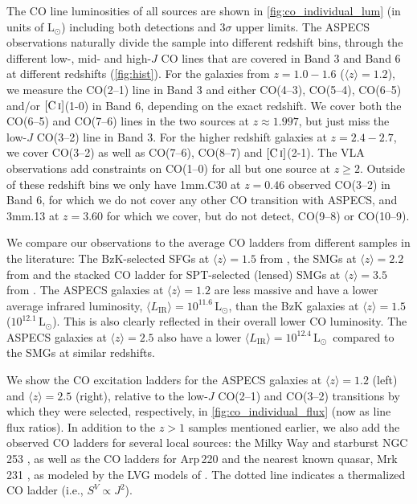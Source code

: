 \documentclass[twocolumn]{aastex62}
\newcommand{\solarlum}{\ensuremath{\mathrm{L}_{\odot}}}
\newcommand{\Lsun}{\solarlum}
\newcommand{\LIR}{\ensuremath{L_{\mathrm{IR}}}}
\newcommand{\avg}[1]{\ensuremath{\langle #1 \rangle}}
\newcommand{\CI}{\ensuremath{\mathrm{[C\, \textsc{i}]}}}
\begin{document}
The CO line luminosities of all sources are shown in
\autoref{fig:co_individual_lum} (in units of \Lsun) including both detections
and $3\sigma$ upper limits.  The ASPECS observations naturally divide the
sample into different redshift bins, through the different low-, mid- and
high-$J$ CO lines that are covered in Band 3 and Band 6 at different redshifts
(\autoref{fig:hist}).  For the galaxies from $z=1.0 - 1.6$ ($\avg{z}=1.2$), we
measure the CO(2--1) line in Band 3 and either CO(4--3), CO(5--4), CO(6--5)
and/or \CI(1-0) in Band 6, depending on the exact redshift.  We cover both the
CO(6--5) and CO(7--6) lines in the two sources at $z\approx 1.997$, but just
miss the low-$J$ CO(3--2) line in Band 3.  For the higher redshift galaxies at
$z=2.4-2.7$, we cover CO(3--2) as well as CO(7--6), CO(8--7) and \CI(2-1).  The
VLA observations add constraints on CO(1--0) for all but one source at $z\ge2$.
Outside of these redshift bins we only have 1mm.C30 at $z=0.46$ observed
CO(3--2) in Band 6, for which we do not cover any other CO transition with
ASPECS, and 3mm.13 at $z=3.60$ for which we cover, but do not detect, CO(9--8)
or CO(10--9).

We compare our observations to the average CO ladders from different samples in
the literature: The BzK-selected SFGs at $\avg{z}=1.5$ from \cite{Daddi2015},
the SMGs at $\avg{z}=2.2$ from \cite{Bothwell2013} and the stacked CO ladder
for SPT-selected (lensed) SMGs at $\avg{z} = 3.5$ from \cite{Spilker2014}.  The
ASPECS galaxies at $\avg{z}=1.2$ are less massive and have a lower average
infrared luminosity, $\avg{\LIR} = 10^{11.6}$\,\Lsun, than the BzK galaxies at
$\avg{z}=1.5$ ($ 10^{12.1}$\,\Lsun).  This is also clearly reflected in their
overall lower CO luminosity.  The ASPECS galaxies at $\avg{z} = 2.5$ also have
a lower $\avg{\LIR} = 10^{{12.4}}$\,\Lsun\ compared to the SMGs at similar
redshifts.

We show the CO excitation ladders for the ASPECS galaxies at $\avg{z}=1.2$
(left) and $\avg{z}=2.5$ (right), relative to the low-$J$ CO(2--1) and CO(3--2)
transitions by which they were selected, respectively, in
\autoref{fig:co_individual_flux} (now as line flux ratios).  In addition to the
$z>1$ samples mentioned earlier, we also add the observed CO ladders for
several local sources: the Milky Way \citep[MW;][Inner Disk]{Fixsen1999} and
starburst NGC\,253 \citep{Rosenberg2014}, as well as the CO ladders for
Arp\,220 \citep{Rangwala2011} and the nearest known quasar, Mrk\,231
\citep{vanderWerf2010}, as modeled by the LVG models of \cite{Weiss2007}.  The
dotted line indicates a thermalized CO ladder (i.e., $S^{V} \propto J^{2}$).
\end{document}
